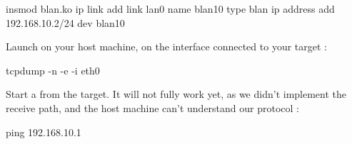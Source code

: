 \begin{targetbashinput}
insmod blan.ko
ip link add link lan0 name blan10 type blan
ip address add 192.168.10.2/24 dev blan10
\end{targetbashinput}

Launch  on your host machine, on the interface connected to your target :

\begin{hostbashinput}
tcpdump -n -e -i eth0
\end{hostbashinput}

Start a  from the target. It will not fully work yet, as we didn't implement the receive path, and the host machine can't understand our protocol :

\begin{targetbashinput}
ping 192.168.10.1
\end{targetbashinput}

